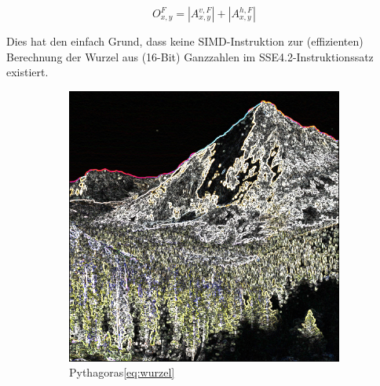 \documentclass[course=erap]{aspdoc}
\begin{document}
\begin{equation}
    O^{F}_{x,y} = \left | A^{v,F}_{x,y} \right | + \left | A^{h,F}_{x,y} \right |
    \label{eq:betrag}
\end{equation}

Dies hat den einfach Grund, dass keine SIMD-Instruktion zur (effizienten) Berechnung der Wurzel aus (16-Bit) Ganzzahlen im SSE4.2-Instruktionssatz existiert.
\begin{figure}[H]
    \begin{subfigure}{.5\columnwidth}
        \centering
        \includegraphics[width=\columnwidth]{graphics/sqrt_sobel}
        \caption{Pythagoras\ref{eq:wurzel}}
        \label{fig:sqrt-bild}
    \end{subfigure}
    \begin{subfigure}{.5\columnwidth}
        \centering

\end{subfigure}
\end{figure}
\end{document}
